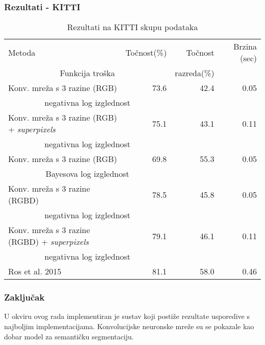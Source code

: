 \documentclass[utf8]{beamer}
\begin{document}
\begin{frame}
\frametitle{Rezultati - KITTI}

\begin{table}
\scriptsize
\centering

\begin{adjustbox}{center}
\begin{tabular}{l r r r}
  Metoda & Točnost(\%) & Točnost & Brzina (sec) \\
    \multicolumn{2}{c}{Funkcija troška} & razreda(\%) & \\[0.6em] \hline

  Konv. mreža s 3 razine (RGB) & 73.6 & 42.4 & 0.05 \\
    \multicolumn{2}{c}{negativna log izglednost} & & \\ \hline
  Konv. mreža s 3 razine (RGB) + \textit{superpixels} & 75.1 & 43.1 & 0.11 \\
    \multicolumn{2}{c}{negativna log izglednost} & & \\ \hline
  Konv. mreža s 3 razine (RGB) & 69.8 & 55.3 & 0.05 \\
    \multicolumn{2}{c}{Bayesova log izglednost} & & \\ \hline
  Konv. mreža s 3 razine (RGBD) & 78.5 & 45.8 & 0.05 \\
    \multicolumn{2}{c}{negativna log izglednost} & & \\ \hline
  Konv. mreža s 3 razine (RGBD) + \textit{superpixels} & 79.1 & 46.1 & 0.11 \\
    \multicolumn{2}{c}{negativna log izglednost} & & \\ \hline \hline
    
  Ros et al. 2015 & 81.1 & 58.0 & 0.46
\end{tabular}
\end{adjustbox}

\caption{Rezultati na KITTI skupu podataka}
\end{table}

\end{frame}


\begin{frame}
\frametitle{Zaključak}

U okviru ovog rada implementiran je sustav koji postiže rezultate usporedive s najboljim implementacijama. Konvolucijske neuronske mreže su se pokazale kao dobar model za semantičku segmentaciju.

\end{frame}
\end{document}
